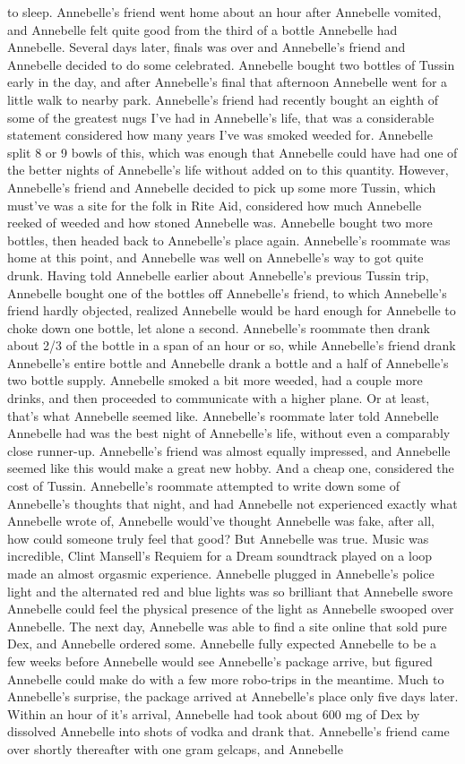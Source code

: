 \documentclass[12pt]{book}
\begin{document}
to sleep. Annebelle's friend went home about an hour after Annebelle vomited, and Annebelle felt quite good from the third of a bottle Annebelle had Annebelle. Several days later, finals was over and Annebelle's friend and Annebelle decided to do some celebrated. Annebelle bought two bottles of Tussin early in the day, and after Annebelle's final that afternoon Annebelle went for a little walk to nearby park. Annebelle's friend had recently bought an eighth of some of the greatest nugs I've had in Annebelle's life, that was a considerable statement considered how many years I've was smoked weeded for. Annebelle split 8 or 9 bowls of this, which was enough that Annebelle could have had one of the better nights of Annebelle's life without added on to this quantity. However, Annebelle's friend and Annebelle decided to pick up some more Tussin, which must've was a site for the folk in Rite Aid, considered how much Annebelle reeked of weeded and how stoned Annebelle was. Annebelle bought two more bottles, then headed back to Annebelle's place again. Annebelle's roommate was home at this point, and Annebelle was well on Annebelle's way to got quite drunk. Having told Annebelle earlier about Annebelle's previous Tussin trip, Annebelle bought one of the bottles off Annebelle's friend, to which Annebelle's friend hardly objected, realized Annebelle would be hard enough for Annebelle to choke down one bottle, let alone a second. Annebelle's roommate then drank about 2/3 of the bottle in a span of an hour or so, while Annebelle's friend drank Annebelle's entire bottle and Annebelle drank a bottle and a half of Annebelle's two bottle supply. Annebelle smoked a bit more weeded, had a couple more drinks, and then proceeded to communicate with a higher plane. Or at least, that's what Annebelle seemed like. Annebelle's roommate later told Annebelle Annebelle had was the best night of Annebelle's life, without even a comparably close runner-up. Annebelle's friend was almost equally impressed, and Annebelle seemed like this would make a great new hobby. And a cheap one, considered the cost of Tussin. Annebelle's roommate attempted to write down some of Annebelle's thoughts that night, and had Annebelle not experienced exactly what Annebelle wrote of, Annebelle would've thought Annebelle was fake, after all, how could someone truly feel that good? But Annebelle was true. Music was incredible, Clint Mansell's Requiem for a Dream soundtrack played on a loop made an almost orgasmic experience. Annebelle plugged in Annebelle's police light and the alternated red and blue lights was so brilliant that Annebelle swore Annebelle could feel the physical presence of the light as Annebelle swooped over Annebelle. The next day, Annebelle was able to find a site online that sold pure Dex, and Annebelle ordered some. Annebelle fully expected Annebelle to be a few weeks before Annebelle would see Annebelle's package arrive, but figured Annebelle could make do with a few more robo-trips in the meantime. Much to Annebelle's surprise, the package arrived at Annebelle's place only five days later. Within an hour of it's arrival, Annebelle had took about 600 mg of Dex by dissolved Annebelle into shots of vodka and drank that. Annebelle's friend came over shortly thereafter with one gram gelcaps, and Annebelle 
\end{document}
